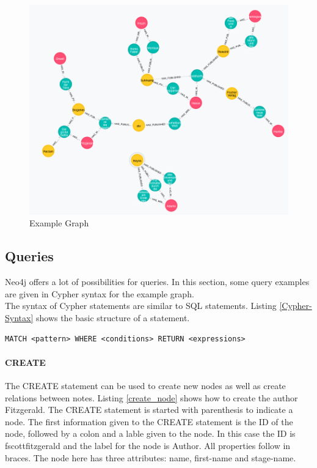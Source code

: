 \begin{figure}
	\centering
		\includegraphics[width=\linewidth]{images/Neo4j_Graph.png}
	\caption{Example Graph}
	\label{example-graph}
\end{figure}

\subsection{Queries}
Neo4j offers a lot of possibilities for queries. In this section, some query examples are given in Cypher syntax for the example graph.\\
The syntax of Cypher statements are similar to SQL statements. Listing \ref{Cypher-Syntax} shows the basic structure  of a statement.
 
\begin{lstlisting}[language={Cypher}, caption={Cypher Syntax}, label={Cypher-Syntax}]
MATCH <pattern> WHERE <conditions> RETURN <expressions>
\end{lstlisting}

\paragraph{CREATE}
The CREATE statement can be used to create new nodes as well as create relations between notes. Listing \ref{create_node} shows how to create the author Fitzgerald. The CREATE statement is started with parenthesis to indicate a node. The first information given to the CREATE statement is the ID of the node, followed by a colon and a lable given to the node. In this case the ID is fscottfitzgerald and the label for the node is Author. All properties follow in braces. The node here has three attributes: name, first-name and stage-name.

